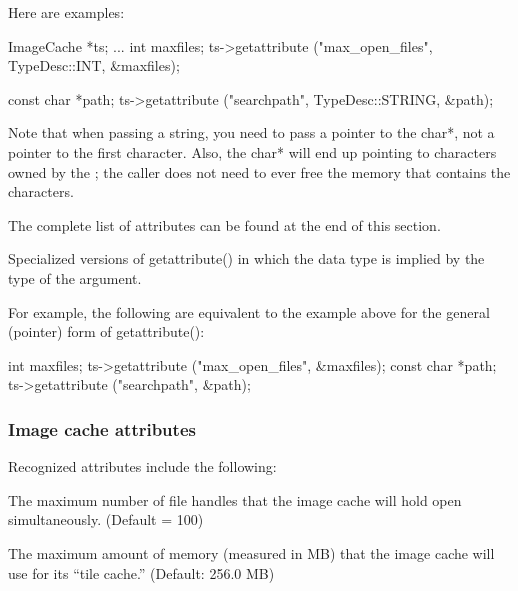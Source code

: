 Here are examples:

\begin{code}
      ImageCache *ts; 
      ...
      int maxfiles;
      ts->getattribute ("max_open_files", TypeDesc::INT, &maxfiles);

      const char *path;
      ts->getattribute ("searchpath", TypeDesc::STRING, &path);
\end{code}

Note that when passing a string, you need to pass a pointer to the {\cf
  char*}, not a pointer to the first character.  Also, the {\cf char*}
will end up pointing to characters owned by the \ImageCache; the
caller does not need to ever free the memory that contains the
characters.

The complete list of attributes can be found at the end of this section.


\apiend

Specialized versions of {\cf getattribute()} in which the data type is
implied by the type of the argument.

For example, the following are equivalent to the example above for the
general (pointer) form of {\cf getattribute()}:

\begin{code}
      int maxfiles;
      ts->getattribute ("max_open_files", &maxfiles);
      const char *path;
      ts->getattribute ("searchpath", &path);
\end{code}

\apiend


\subsubsection*{Image cache attributes}

Recognized attributes include the following:

The maximum number of file handles that the image cache will
hold open simultaneously.  (Default = 100)
\apiend

The maximum amount of memory (measured in MB) that the image cache
will use for its ``tile cache.'' (Default: 256.0 MB)
\apiend

